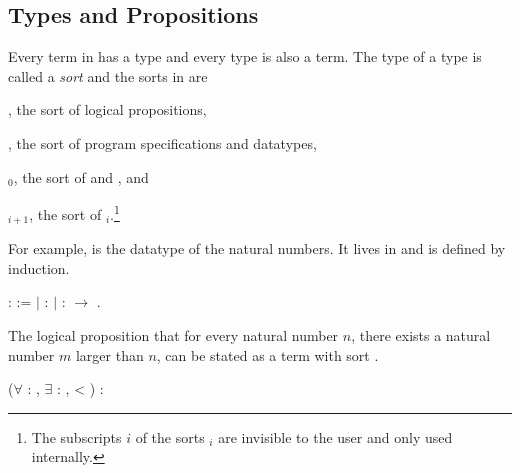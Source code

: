 \subsection{Types and Propositions}

Every term in \Coq has a type and every type is also a
term. The type of a type is called a \emph{sort} and the sorts
in \Coq are
\begin{compactitem}
\item {}, the sort of logical propositions,
\item {}, the sort of program specifications and datatypes,
\item {}$_0$, the sort of  and
  , and
\item {}$_{i+1}$, the sort of
  $_i$.\footnote{The subscripts $i$ of the sorts
    $_i$ are invisible to the user and only used
    internally.}
\end{compactitem}
For example,
is the datatype of the natural numbers. It lives in  and
is defined by induction.
\begin{singlespace}
\begin{coqdoccode}
\coqdocnoindent
{} 
:
 :=\coqdoceol
\coqdocindent{1.0em}
\ensuremath{|} 
:
\coqdoceol
\coqdocindent{1.0em}
\ensuremath{|} 
:
 $\rightarrow$
.\coqdoceol
\end{coqdoccode}
\end{singlespace}
The logical proposition that for every natural number $n$, there
exists a natural number $m$ larger than $n$, can be stated as a term
with sort .
\begin{singlespace}
\begin{coqdoccode}
\coqdocnoindent
(\ensuremath{\forall}  :
,
\ensuremath{\exists}  :
,
 < ) : \coqdoceol
\end{coqdoccode}
\end{singlespace}
